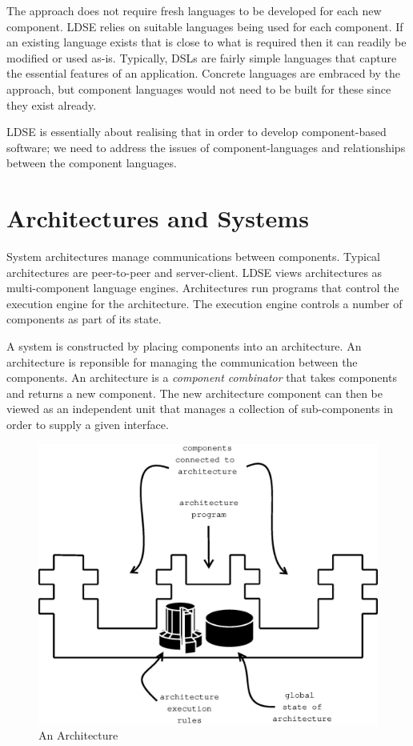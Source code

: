 \documentclass{article}
\begin{document}
The approach does not require fresh languages to be developed for each new component.
LDSE relies on suitable languages being used for each component. If an existing language
exists that is close to what is required then it can readily be modified or used as-is.
Typically, DSLs are fairly simple languages that capture the essential features of an
application. Concrete languages are embraced by the approach, but component languages
would not need to be built for these since they exist already. 

LDSE is essentially about realising that in order to develop component-based software; 
we need to address the issues of component-languages and relationships between the component 
languages.

\section{Architectures and Systems}

System architectures manage communications between components. Typical architectures
are peer-to-peer and server-client. LDSE views architectures as multi-component language
engines. Architectures run programs that control the execution engine for the architecture.
The execution engine controls a number of components as part of its state.

A system is constructed by placing components into an architecture. An architecture is reponsible 
for managing the communication between the components. An architecture is a {\em component
combinator} that takes components and returns a new component. The new architecture
component can then be viewed as an independent unit that manages a collection of sub-components
in order to supply a given interface.

\begin{figure}
\begin{center}
\includegraphics[scale=0.5]{Architecture.eps}
\end{center}
\caption{An Architecture}
\label{Architecture}
\end{figure}
\end{document}
